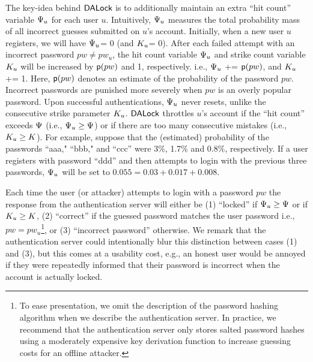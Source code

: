 The key-idea behind $\mathsf{DALock}$ is to additionally maintain an extra ``hit count'' variable $\Psi_{u}$ for each user $u$. Intuitively, $\Psi_{u}$ measures the total probability mass of all incorrect guesses submitted on $u$’s account. Initially, when a new user $u$ registers, we will have $\Psi_{u}$= 0 (and $K_u$= 0). After each failed attempt with an incorrect password $pw \neq pw_u$, the hit count variable $\Psi_{u}$ and strike count variable $K_u$ will be increased by $\textsf{p}(pw)$ and 1, respectively. i.e.,  $\Psi_{u}$ += $\textsf{p}(pw)$, and $K_u$ += 1. Here, $\textsf{p}(pw)$ denotes an estimate of the probability of the password $pw$. Incorrect passwords are punished more severely when $pw$ is an overly popular password. Upon successful authentications, $\Psi_{u}$ never resets, unlike the consecutive strike parameter $K_u$. $\mathsf{DALock}$ throttles $u$'s account if the ``hit count'' exceeds $\Psi$ (i.e., $\Psi_{u} \geq \Psi$) or if there are too many consecutive mistakes (i.e., $K_{u} \geq K$). For example, suppose that the (estimated) probability of the passwords ``aaa," ``bbb," and ``ccc'' were 3\%, 1.7\% and 0.8\%, respectively. If a user registers with password ``ddd'' and then attempts to login with the previous three passwords, $\Psi_{u}$ will be set to $0.055=0.03+0.017+0.008$. 

Each time the user (or attacker) attempts to login with a password $pw$ the response from the authentication server will either be (1) ``locked'' if $\Psi_{u} \geq \Psi$ or if $K_{u} \geq K$, (2) ``correct'' if the guessed password matches the user password i.e., $pw = pw_u$\footnote{To ease presentation, we omit the description of the password hashing algorithm when we describe the authentication server. In practice, we recommend that the authentication server only stores salted password hashes using a moderately expensive key derivation function to increase guessing costs for an offline attacker.}, or (3) ``incorrect password'' otherwise. We remark that the authentication server could intentionally blur this distinction between cases (1) and (3), but this comes at a usability cost, e.g., an honest user would be annoyed if they were repeatedly informed that their password is incorrect when the account is actually locked.

